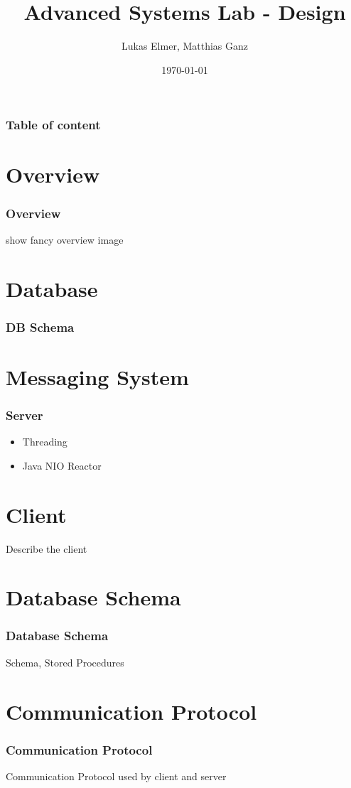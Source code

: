 \documentclass{beamer}
\title{Advanced Systems Lab - Design}
\author{Lukas Elmer, Matthias Ganz}
\date{\today}
\begin{document}
\begin{frame}
\titlepage
\end{frame} 

\begin{frame}
\frametitle{Table of content}
\tableofcontents
\end{frame} 



\section{Overview}
\begin{frame}
\frametitle{Overview}
show fancy overview image
\end{frame}

\section{Database}
\begin{frame}
\frametitle{DB Schema}

\end{frame}


\section{Messaging System}
\begin{frame}
\frametitle{Server}
\begin{itemize}
\item Threading
\item Java NIO Reactor
\end{itemize}
\end{frame}


\section{Client}
\begin{frame}
Describe the client
\end{frame}

\section{Database Schema}
\begin{frame}
\frametitle{Database Schema}
Schema, Stored Procedures
\end{frame}


\section{Communication Protocol}
\begin{frame}
\frametitle{Communication Protocol}
Communication Protocol used by client and server
\end{frame}
\end{document}
